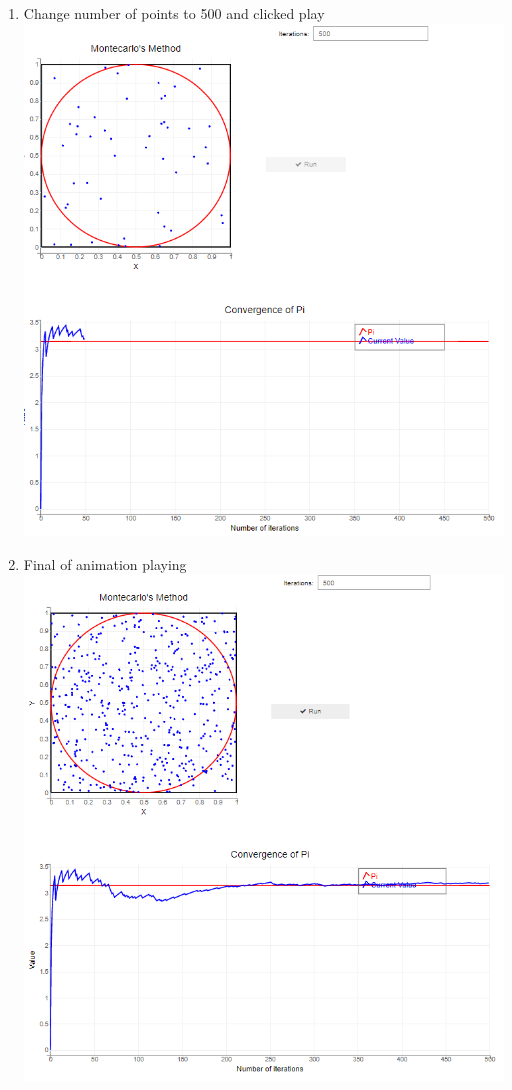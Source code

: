 \begin{enumerate}
    \item Change number of points to 500 and clicked play\\
    \includegraphics[scale=0.7]{Include/Images/Thesis/Documentation/Visualizers/Randomness/Example 1/Example 1 - 02 - Changed N of points and played.png}
    \item Final of animation playing\\
    \includegraphics[scale=0.7]{Include/Images/Thesis/Documentation/Visualizers/Randomness/Example 1/Example 1 - 03 - Finished.png}
\end{enumerate}



